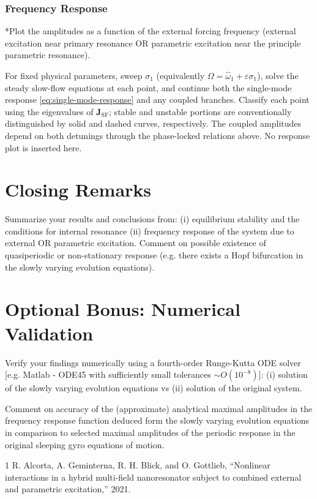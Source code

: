 \documentclass[11pt]{article}
\newenvironment{assignmentinstruction}{\par\begingroup\color{blue}}{\par\endgroup}
\begin{document}
\subsubsection{Frequency Response}
\begin{assignmentinstruction}
*Plot the amplitudes as a function of the external forcing frequency (external excitation near primary resonance OR parametric excitation near the principle parametric resonance).
\end{assignmentinstruction}
For fixed physical parameters, sweep $\sigma_1$ (equivalently $\Omega=\hat\omega_1+\varepsilon\sigma_1$), solve the steady slow-flow equations at each point, and continue both the single-mode response \eqref{eq:single-mode-response} and any coupled branches. Classify each point using the eigenvalues of $\mathbf{J}_{\mathrm{SF}}$; stable and unstable portions are conventionally distinguished by solid and dashed curves, respectively. The coupled amplitudes depend on both detunings through the phase-locked relations above. No response plot is inserted here.

\section{Closing Remarks}
\begin{assignmentinstruction}
Summarize your results and conclusions from: (i) equilibrium stability and the conditions for internal resonance (ii) frequency response of the system due to external OR parametric excitation. Comment on possible existence of quasiperiodic or non-stationary response (e.g. there exists a Hopf bifurcation in the slowly varying evolution equations).
\end{assignmentinstruction}

\section{Optional Bonus: Numerical Validation}
\begin{assignmentinstruction}
Verify your findings numerically using a fourth-order Runge-Kutta ODE solver [e.g. Matlab - ODE45 with sufficiently small tolerances $\sim O(10^{-8})$]: (i) solution of the slowly varying evolution equations vs (ii) solution of the original system.

Comment on accuracy of the (approximate) analytical maximal amplitudes in the frequency response function deduced form the slowly varying evolution equations in comparison to selected maximal amplitudes of the periodic response in the original sleeping gyro equations of motion.
\end{assignmentinstruction}

\begin{thebibliography}{1}
R. Alcorta, A. Geminterna, R. H. Blick, and O. Gottlieb,
``Nonlinear interactions in a hybrid multi-field nanoresonator subject to combined external and parametric excitation,'' 2021.
\end{thebibliography}
\end{document}
